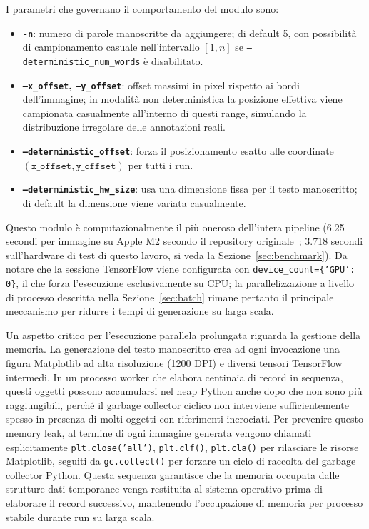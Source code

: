 I parametri che governano il comportamento del modulo sono:

\begin{itemize}
    \item \textbf{\texttt{-n}}: numero di parole manoscritte da aggiungere; di default 5, con possibilità di campionamento casuale nell'intervallo $[1, n]$ se \texttt{--deterministic\_num\_words} è disabilitato.
    \item \textbf{\texttt{--x\_offset}, \texttt{--y\_offset}}: offset massimi in pixel rispetto ai bordi dell'immagine; in modalità non deterministica la posizione effettiva viene campionata casualmente all'interno di questi range, simulando la distribuzione irregolare delle annotazioni reali.
    \item \textbf{\texttt{--deterministic\_offset}}: forza il posizionamento esatto alle coordinate $(\texttt{x\_offset}, \texttt{y\_offset})$ per tutti i run.
    \item \textbf{\texttt{--deterministic\_hw\_size}}: usa una dimensione fissa per il testo manoscritto; di default la dimensione viene variata casualmente.
\end{itemize}

Questo modulo è computazionalmente il più oneroso dell'intera pipeline (6.25 secondi per immagine su Apple M2 secondo il repository originale~\cite{ecgimagekitpaper}; 3.718 secondi sull'hardware di test di questo lavoro, si veda la Sezione~\ref{sec:benchmark}). Da notare che la sessione TensorFlow viene configurata con \texttt{device\_count=\{'GPU': 0\}}, il che forza l'esecuzione esclusivamente su CPU; la parallelizzazione a livello di processo descritta nella Sezione~\ref{sec:batch} rimane pertanto il principale meccanismo per ridurre i tempi di generazione su larga scala.

Un aspetto critico per l'esecuzione parallela prolungata riguarda la gestione della memoria. La generazione del testo manoscritto crea ad ogni invocazione una figura Matplotlib ad alta risoluzione (1200 DPI) e diversi tensori TensorFlow intermedi. In un processo worker che elabora centinaia di record in sequenza, questi oggetti possono accumularsi nel heap Python anche dopo che non sono più raggiungibili, perché il garbage collector ciclico non interviene sufficientemente spesso in presenza di molti oggetti con riferimenti incrociati. Per prevenire questo memory leak, al termine di ogni immagine generata vengono chiamati esplicitamente \texttt{plt.close('all')}, \texttt{plt.clf()}, \texttt{plt.cla()} per rilasciare le risorse Matplotlib, seguiti da \texttt{gc.collect()} per forzare un ciclo di raccolta del garbage collector Python. Questa sequenza garantisce che la memoria occupata dalle strutture dati temporanee venga restituita al sistema operativo prima di elaborare il record successivo, mantenendo l'occupazione di memoria per processo stabile durante run su larga scala.

